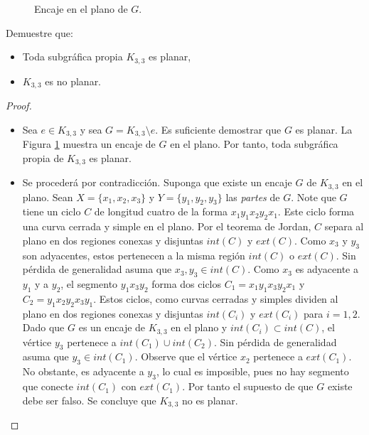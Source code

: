 \documentclass[12pt]{article}
\newenvironment{problem}[2][Problema]{\begin{trivlist}
\item[\hskip \labelsep {\bfseries #1}\hskip \labelsep {\bfseries #2.}]}{\end{trivlist}}
\begin{document}
\begin{figure}
\begin{tikzpicture}[x=0.75pt,y=0.75pt,yscale=-1,xscale=1]
\end{tikzpicture}
    \caption{Encaje en el plano de $G$.}
    \label{fig:f1}
\end{figure}
\newpage

\begin{problem}{10.1.1} Demuestre que:
\begin{itemize}
    \item[a)] Toda subgráfica propia $K_{3,3}$ es planar,
    \item[b)] $K_{3,3}$ es no planar. 
\end{itemize}
\end{problem}
\begin{proof} \text{ }
\begin{itemize}
    \item[a)] Sea $e \in K_{3,3}$ y sea $G = K_{3,3} \setminus e$. Es suficiente demostrar que $G$ es planar. La Figura \ref{fig:f1} muestra un encaje de $G$ en el plano. Por tanto, toda subgráfica propia de $K_{3,3}$ es planar.
    
    \item[b)] Se procederá por contradicción. Suponga que existe un encaje $G$ de $K_{3,3}$ en el plano. Sean $X = \{x_1, x_2, x_3\}$ y $Y =\{y_1, y_2, y_3 \}$ las \textit{partes} de $G$. Note que $G$ tiene un ciclo $C$ de longitud cuatro de la forma $x_1 y_1 x_2 y_2x_1.$ Este ciclo forma una curva cerrada y simple en el plano. Por el teorema de Jordan, $C$ separa al plano en dos regiones conexas y disjuntas $int(C)$ y $ext(C).$ Como $x_3$ y $y_3$ son adyacentes, estos pertenecen a la misma región $int(C)$ o $ext(C).$ Sin pérdida de generalidad asuma que $x_3, y_3 \in int(C).$ Como $x_3$ es adyacente a $y_1$ y a $y_2$, el segmento $y_1 x_3 y_2$ forma dos ciclos $C_1 = x_1 y_1 x_3 y_2 x_1$ y $C_2 = y_1 x_2 y_2 x_3 y_1$. Estos ciclos, como curvas cerradas y simples dividen al plano en dos regiones conexas y disjuntas $int(C_i)$ y $ext(C_i)$ para $i=1,2.$ Dado que $G$ es un encaje de $K_{3,3}$ en el plano y $int(C_i) \subset int(C)$, el vértice $y_3$ pertenece a $ int(C_1) \cup int(C_2).$ Sin pérdida de generalidad asuma que $y_3 \in int(C_1).$ Observe que el vértice $x_2$ pertenece a $ext(C_1).$ No obstante, es adyacente a $y_3$, lo cual es imposible, pues no hay segmento que conecte $int(C_1)$ con $ext(C_1).$ Por tanto el supuesto de que $G$ existe debe ser falso. Se concluye que $K_{3,3}$ no es planar.
\end{itemize}
\end{proof}
\end{document}
